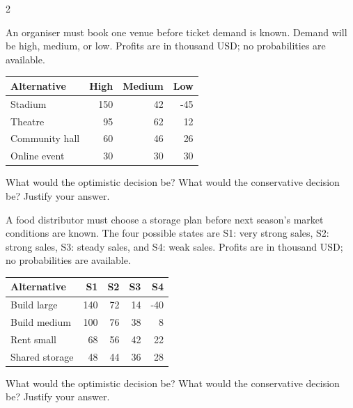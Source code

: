\begin{multicols}{2}
\begin{minipage}{\linewidth}
An organiser must book one venue before ticket demand is known. Demand will be high, medium, or low. Profits are in thousand USD; no probabilities are available.
\begin{center}\small\setlength{\tabcolsep}{4pt}
\begin{tabular}{@{}lrrr@{}}\toprule
Alternative&High&Medium&Low\\\midrule
Stadium&150&42&-45\\
Theatre&95&62&12\\
Community hall&60&46&26\\
Online event&30&30&30\\\bottomrule
\end{tabular}\end{center}

What would the optimistic decision be? What would the conservative decision be? Justify your answer. 
\end{minipage}\par

\begin{minipage}{\linewidth}
A food distributor must choose a storage plan before next season's market conditions are known. The four possible states are S1: very strong sales, S2: strong sales, S3: steady sales, and S4: weak sales. Profits are in thousand USD; no probabilities are available.
\begin{center}\small\setlength{\tabcolsep}{4pt}
\begin{tabular}{@{}lrrrr@{}}\toprule
Alternative&S1&S2&S3&S4\\\midrule
Build large&140&72&14&-40\\
Build medium&100&76&38&8\\
Rent small&68&56&42&22\\
Shared storage&48&44&36&28\\\bottomrule
\end{tabular}\end{center}

What would the optimistic decision be? What would the conservative decision be? Justify your answer. 
\end{minipage}\par


\end{multicols}
